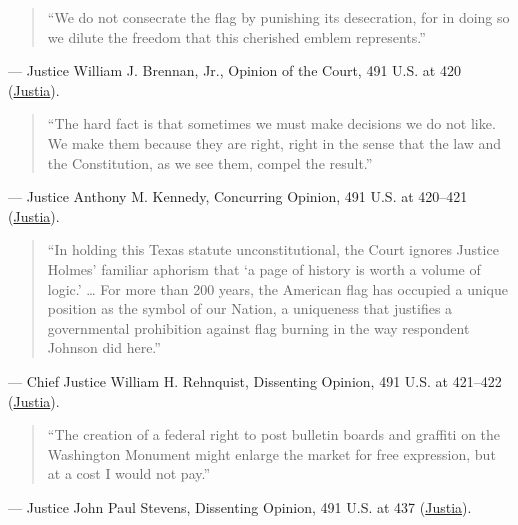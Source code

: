 \documentclass[12pt]{article}
\begin{document}
\begin{quote}
``We do not consecrate the flag by punishing its desecration, for in doing so we dilute the freedom that this cherished emblem represents.''
\end{quote}
\noindent --- Justice William J. Brennan, Jr., Opinion of the Court, 491 U.S. at 420 (\href{https://supreme.justia.com/cases/federal/us/491/397/}{Justia}).

\begin{quote}
``The hard fact is that sometimes we must make decisions we do not like. We make them because they are right, right in the sense that the law and the Constitution, as we see them, compel the result.''
\end{quote}
\noindent --- Justice Anthony M. Kennedy, Concurring Opinion, 491 U.S. at 420--421 (\href{https://supreme.justia.com/cases/federal/us/491/397/}{Justia}).

\begin{quote}
``In holding this Texas statute unconstitutional, the Court ignores Justice Holmes' familiar aphorism that `a page of history is worth a volume of logic.' \dots{} For more than 200 years, the American flag has occupied a unique position as the symbol of our Nation, a uniqueness that justifies a governmental prohibition against flag burning in the way respondent Johnson did here.''
\end{quote}
\noindent --- Chief Justice William H. Rehnquist, Dissenting Opinion, 491 U.S. at 421--422 (\href{https://supreme.justia.com/cases/federal/us/491/397/}{Justia}).

\begin{quote}
``The creation of a federal right to post bulletin boards and graffiti on the Washington Monument might enlarge the market for free expression, but at a cost I would not pay.''
\end{quote}
\noindent --- Justice John Paul Stevens, Dissenting Opinion, 491 U.S. at 437 (\href{https://supreme.justia.com/cases/federal/us/491/397/}{Justia}).
\end{document}
